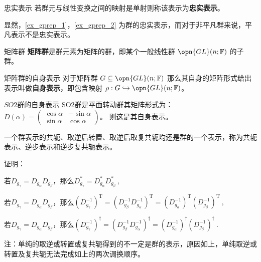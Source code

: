 \begin{definition}{忠实表示}
若群元与线性变换之间的映射是单射则称该表示为\textbf{忠实表示}。
\end{definition}

显然，\autoref{ex_gprep_1}，\autoref{ex_gprep_2} 为群的忠实表示，而对于非平凡群来说，平凡表示不是忠实表示。

\begin{definition}{矩阵群}
\textbf{矩阵群}是群元素为矩阵的群，即某个一般线性群 $\opn{GL}(n; \mathbb{F})$ 的子群。
\end{definition}

\begin{definition}{矩阵群的自身表示}
对于矩阵群 $G \subseteq \opn{GL}(n; \mathbb{F})$ 那么其自身的矩阵形式给出表示叫做\textbf{自身表示}，即包含映射 $\rho: G \hookrightarrow \opn{GL}(n; \mathbb{F})$。
\end{definition}

\begin{example}{$SO2$群的自身表示}
SO2群是平面转动群其矩阵形式为：$D(\alpha)=\begin{pmatrix}
 \cos{\alpha} & -\sin{\alpha}\\
 \sin{\alpha} & \cos{\alpha}
\end{pmatrix}$。
则这是其自身表示。
\end{example}

\begin{corollary}{}
一个群表示的共轭、取逆后转置、取逆后取复共轭均还是群的一个表示，称为共轭表示、逆步表示和逆步复共轭表示。
\end{corollary}

证明：

若$D_{g_\gamma}=D_{g_\alpha}D_{g_\beta}$，那么$D_{g_\gamma}^*=D_{g_\alpha}^*D_{g_\beta}^*~,$

若$D_{g_\gamma}=D_{g_\alpha}D_{g_\beta}$，那么$(D_{g_\gamma}^{-1})^\mathrm{T}=(D_{g_\beta}^{-1}D_{g_\alpha}^{-1})^\mathrm{T}=(D_{g_\alpha}^{-1})^\mathrm{T}(D_{g_\beta}^{-1})^\mathrm{T}~,$

若$D_{g_\gamma}=D_{g_\alpha}D_{g_\beta}$，那么$(D_{g_\gamma}^{-1})^\dagger=(D_{g_\beta}^{-1}D_{g_\alpha}^{-1})^\dagger=(D_{g_\alpha}^{-1})^\dagger(D_{g_\beta}^{-1})^\dagger~.$

注：单纯的取逆或转置或复共轭得到的不一定是群的表示，原因如上，单纯取逆或转置及复共轭无法完成如上的两次调换顺序。
